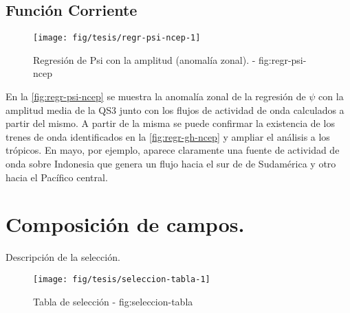 \documentclass[spanish,a4paper]{book}
\begin{document}
\subsection{Función Corriente}\label{funcion-corriente-1}

\begin{landscape}\begin{figure}

{\centering \texttt{[image: fig/tesis/regr-psi-ncep-1]} 

}

\caption{Regresión de Psi con la amplitud (anomalía zonal). - fig:regr-psi-ncep}\label{fig:regr-psi-ncep}
\end{figure}
\end{landscape}

En la \autoref{fig:regr-psi-ncep} se muestra la anomalía zonal de la
regresión de \(\psi\) con la amplitud media de la QS3 junto con los
flujos de actividad de onda calculados a partir del mismo. A partir de
la misma se puede confirmar la existencia de los trenes de onda
identificados en la \autoref{fig:regr-gh-ncep} y ampliar el análisis a
los trópicos. En mayo, por ejemplo, aparece claramente una fuente de
actividad de onda sobre Indonesia que genera un flujo hacia el sur de de
Sudamérica y otro hacia el Pacífico central.

\section{Composición de campos.}\label{composicion-de-campos.}


Descripción de la selección.

\begin{landscape}\begin{figure}

{\centering \texttt{[image: fig/tesis/seleccion-tabla-1]} 

}

\caption{Tabla de selección - fig:seleccion-tabla}\label{fig:seleccion-tabla}
\end{figure}
\end{landscape}
\end{document}
